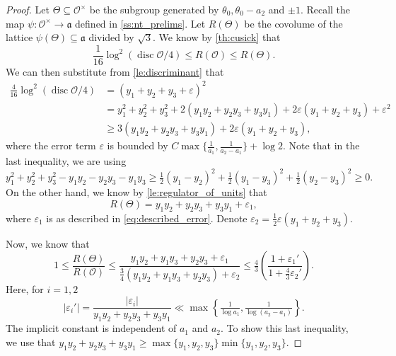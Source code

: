 \documentclass[11pt,letterpaper]{amsart}
\theoremstyle{definition}
\theoremstyle{remark}
\newcommand{\cal}[1]{\mathcal{#1}}
\newcommand{\calO}{\cal O}
\DeclareMathOperator{\disc}{disc}
\begin{document}
\begin{proof}
		Let $\Theta \subseteq \calO^{\times}$ be the subgroup generated by $\theta_0,\theta_0-a_2$ and $\pm 1$. 
		Recall the map $\psi : \calO^{\times} \rightarrow \mathfrak{a}$ defined in \cref{ss:nt_prelims}.
		Let $R(\Theta)$ be the covolume of the lattice $\psi(\Theta) \subseteq \mathfrak{a}$ divided by $\sqrt{3}$.
		We know by \cref{th:cusick}
		that 
		\begin{equation}
			\frac{1}{16}   \log^2 (\disc\calO/4) 
			\leq R(\calO)   \leq R(\Theta)  .
		\end{equation}
		We can then substitute from \cref{le:discriminant} that
		\begin{align}
			\frac{4}{16} \log^2 (\disc\calO/4)  & =  (y_1+y_2 +y_3 + \varepsilon)^{2} \\
			& = y_1^{2} + y_2^{2} + y_{3}^{2} + 2(y_1y_2 + y_2y_3 + y_3 y_1) +2 \varepsilon(y_1 + y_2 + y_3)+\varepsilon^2\\
			& \geq 3(y_1 y_2 + y_2 y_3 + y_3 y_1) +2 \varepsilon(y_1 + y_2 + y_3),
		\end{align}
		where the error term $\varepsilon$ is bounded by $C\max\{\tfrac{1}{a_1}, \tfrac{1}{a_2 - a_1}\}+\log 2$.
		Note that in the last inequality, we are using
		\begin{equation}
			y_1^{2} + y_2^{2}+y_3^{2}  - y_1y_2 - y_2 y_3 - y_1y_3\geq \tfrac{1}{2}(y_1-y_2)^{2}+ \tfrac{1}{2}(y_1-y_3)^{2}+ \tfrac{1}{2}(y_2-y_3)^{2} \geq 0.
		\end{equation}
		On the other hand, we know by  \cref{le:regulator_of_units}
		that 
		\begin{equation}
			R(\Theta ) = y_1 y_2 + y_2 y_3 + y_3 y_1 + \varepsilon_1,
		\end{equation}
		where $\varepsilon _1 $ is as described in  \cref{eq:described_error}. Denote $\varepsilon_2 =\tfrac{1}{2} \varepsilon(y_1 + y_2 + y_3)$. 
		
		
		Now, we know that 
		\begin{equation}
			1 \leq   \frac{R(\Theta)}{R(\calO)} \leq \frac{  y_1y_2 + y_1 y_3 + y_2 y_3 + \varepsilon_1 }{ \tfrac{3}{4}( y_1 y_2 + y_1 y_3 + y_2 y_3  )+ \varepsilon_2} \leq  \tfrac{4}{3} \left(\frac{1+ \varepsilon_1{'}}{ 1 + \tfrac{4}{3}\varepsilon_2'}\right).
		\end{equation}
		Here, for $i=1,2$
		\begin{equation}
			|\varepsilon_i'| = \frac{|\varepsilon_i|}{y_1y_2 + y_2y_3 + y_3y_1} \ll \max\left\{\tfrac{1}{\log a_1}, \tfrac{1}{\log(a_2-a_1)} \right\}.
		\end{equation}
		The implicit constant is independent of $a_1$ and $a_2$.
		To show this last inequality, we use that $ y_1y_2+y_2y_3+y_3y_1\geq \max\{y_1,y_2,y_3\}\min\{y_1,y_2,y_3 \}$.
		

\end{proof}
\end{document}
